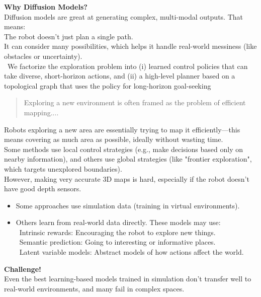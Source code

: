 \documentclass[12pt]{article}
\begin{document}
\textbf{Why Diffusion Models?}\\
Diffusion models are great at generating complex, multi-modal outputs. That means:\\
The robot doesn’t just plan a single path.\\
It can consider many possibilities, which helps it handle real-world messiness (like obstacles or uncertainty).\\
\
We factorize the exploration problem into (i) learned control
policies that can take diverse, short-horizon actions, and (ii)
a high-level planner based on a topological graph that uses
the policy for long-horizon goal-seeking
\bigskip
\begin{quotation}
    Exploring a new environment is often framed as the problem of efficient mapping....
\end{quotation}
Robots exploring a new area are essentially trying to map it efficiently—this means covering as much area as possible, ideally without wasting time.\\
Some methods use local control strategies (e.g., make decisions based only on nearby information), and others use global strategies (like "frontier exploration", which targets unexplored boundaries).\\
However, making very accurate 3D maps is hard, especially if the robot doesn't have good depth sensors.\\
\begin{itemize}
    \item Some approaches use simulation data (training in virtual environments).
    \item  Others learn from real-world data directly.
    These models may use:\\
    \ Intrinsic rewards: Encouraging the robot to explore new things.\\
    \ Semantic prediction: Going to interesting or informative places.\\
    \ Latent variable models: Abstract models of how actions affect the world.
\end{itemize}

\textbf{Challenge!}\\
Even the best learning-based models trained in simulation don't transfer well to real-world environments, and many fail in complex spaces.\\
\end{document}
